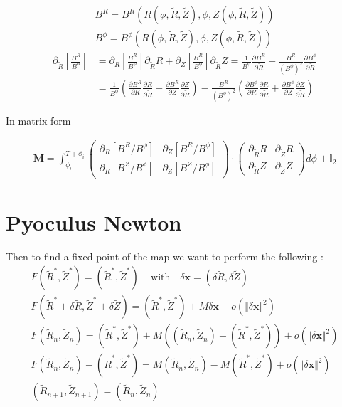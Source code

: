 \begin{align*}
  B^R = B^R(R(\phi, \tilde{R}, \tilde{Z}), \phi, Z(\phi, \tilde{R}, \tilde{Z}))\\
    B^\phi = B^\phi(R(\phi, \tilde{R}, \tilde{Z}), \phi, Z(\phi, \tilde{R}, \tilde{Z}))
\end{align*}
\begin{align*}
    \partial_{\tilde{R}}\left[\frac{B^R}{B^\phi}\right] &= \partial_{R}\left[\frac{B^R}{B^\phi}\right]\partial_{\tilde{R}}R + \partial_{Z}\left[\frac{B^R}{B^\phi}\right]\partial_{\tilde{R}}Z = \frac{1}{B^\phi}\frac{\partial B^R}{\partial\tilde{R}} - \frac{B^R}{(B^\phi)^2}\frac{\partial B^\phi}{\partial\tilde{R}} \\&= \frac{1}{B^\phi}\left(\frac{\partial B^R}{\partial R}\frac{\partial R}{\partial\tilde{R}}+\frac{\partial B^R}{\partial Z}\frac{\partial Z}{\partial\tilde{R}}\right) - \frac{B^R}{(B^\phi)^2}\left(\frac{\partial B^\phi}{\partial R}\frac{\partial R}{\partial\tilde{R}}+\frac{\partial B^\phi}{\partial Z}\frac{\partial Z}{\partial\tilde{R}}\right)
\end{align*}

In matrix form

\begin{align}
    \textbf{M} = \int_{\phi_i}^{T+\phi_i}\begin{pmatrix}
        \partial_{R}\left[B^R/B^\phi\right] & \partial_{Z}\left[B^R/B^\phi\right]\\
        \partial_{R}\left[B^Z/B^\phi\right] & \partial_{Z}\left[B^Z/B^\phi\right]
    \end{pmatrix}\cdot\begin{pmatrix}
        \partial_{\tilde{R}}R & \partial_{\tilde{Z}}R\\
        \partial_{\tilde{R}}Z & \partial_{\tilde{Z}}Z
    \end{pmatrix}d\phi + \mathbb{I}_2
\end{align}

\section{Pyoculus Newton}

Then to find a fixed point of the map we want to perform the following :
\begin{align*}
    F(\tilde{R}^*, \tilde{Z}^*) = (\tilde{R}^*, \tilde{Z}^*)\,\quad\text{with}\quad \delta\textbf{x}=(\delta \tilde{R}, \delta \tilde{Z})\\
    F(\tilde{R}^*+\delta \tilde{R}, \tilde{Z}^*+\delta \tilde{Z}) = (\tilde{R}^*, \tilde{Z}^*) + M\delta\textbf{x}+ o(\Vert \delta\textbf{x}\Vert^2)\\
    F(\tilde{R}_n,\tilde{Z}_n) = (\tilde{R}^*, \tilde{Z}^*) + M((\tilde{R}_n,\tilde{Z}_n) - (\tilde{R}^*, \tilde{Z}^*))+ o(\Vert \delta\textbf{x}\Vert^2)\\
    F(\tilde{R}_n,\tilde{Z}_n) - (\tilde{R}^*, \tilde{Z}^*)  = M(\tilde{R}_n,\tilde{Z}_n) - M(\tilde{R}^*, \tilde{Z}^*)+ o(\Vert \delta\textbf{x}\Vert^2)\\
    (\tilde{R}_{n+1},\tilde{Z}_{n+1}) = (\tilde{R}_n,\tilde{Z}_n)
\end{align*}



